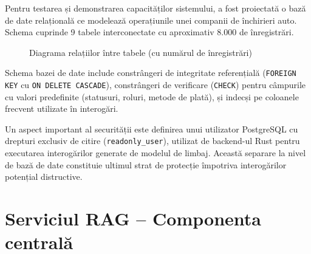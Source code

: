 \documentclass[12pt, a4paper]{report}
\newcommand{\code}[1]{\texttt{#1}}
\begin{document}
Pentru testarea și demonstrarea capacităților sistemului, a fost proiectată o bază de date relațională ce modelează operațiunile unei companii de închirieri auto. Schema cuprinde 9 tabele interconectate cu aproximativ 8.000 de înregistrări.

\begin{figure}[H]
\centering
{}
\caption{Diagrama relațiilor între tabele (cu numărul de înregistrări)}
\label{fig:er}
\end{figure}

Schema bazei de date include constrângeri de integritate referențială (\code{FOREIGN KEY} cu \code{ON DELETE CASCADE}), constrângeri de verificare (\code{CHECK}) pentru câmpurile cu valori predefinite (statusuri, roluri, metode de plată), și indecși pe coloanele frecvent utilizate în interogări.

Un aspect important al securității este definirea unui utilizator PostgreSQL cu drepturi exclusiv de citire (\code{readonly\_user}), utilizat de backend-ul Rust pentru executarea interogărilor generate de modelul de limbaj. Această separare la nivel de bază de date constituie ultimul strat de protecție împotriva interogărilor potențial distructive.

\section{Serviciul RAG -- Componenta centrală}
\end{document}
